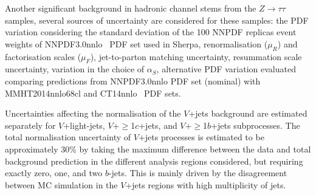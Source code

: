 \documentclass[PAPER, coverpage, atlasdraft=true, texlive=2016, UKenglish]{\ATLASLATEXPATH atlasdoc} %
\begin{document}
Another significant background in hadronic channel stems from the $Z\rightarrow \tau\tau$ samples, several sources of uncertainty are
considered for these samples: the PDF variation considering the standard deviation of the 100 NNPDF replicas event weights
of NNPDF3.0nnlo~\cite{Ball:2015NNPDF} PDF
set used in Sherpa, renormalisation ($\mu_{R}$) and factorisation scales ($\mu_{F}$), jet-to-parton matching uncertainty, resummation scale uncertainty,
variation in the choice of $\alpha_{S}$, alternative PDF variation evaluated comparing predictions from NNPDF3.0nnlo PDF set (nominal)
with MMHT2014nnlo68cl and CT14nnlo~\cite{Lai:2010vv,Gao:2013xoa} PDF sets.

Uncertainties affecting the normalisation of the $V$+jets background are estimated separately for $V$+light-jets, $V$+$\geq$1$c$+jets,
and $V$+$\geq$1$b$+jets subprocesses. The total normalisation uncertainty of $V$+jets processes is estimated to be approximately 30\% by taking the maximum
difference between the data and total background prediction in the different analysis regions considered, but requiring exactly zero, one, and two $b$-jets.
This is mainly driven by the disagreement between MC simulation in the $V$+jets regions with high multiplicity of jets.  

\end{document}
